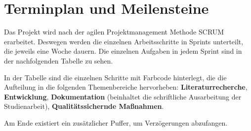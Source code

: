 


\newcommand{\Titel}{Projektplan}





\section{Terminplan und Meilensteine}
Das Projekt wird nach der agilen Projektmanagement Methode SCRUM erarbeitet.
Deswegen werden die einzelnen Arbeitsschritte in Sprints unterteilt, die jeweils eine Woche dauern.
Die einzelnen Aufgaben in jedem Sprint sind in der nachfolgenden Tabelle zu sehen.

In der Tabelle sind die einzelnen Schritte mit Farbcode hinterlegt, die die Aufteilung in die folgenden Themenbereiche hervorheben: \textcolor{literaturrecherche}{\textbf{Literaturrecherche}}, \textcolor{entwicklung}{\textbf{Entwicklung}}, \textcolor{dokumentation}{\textbf{Dokumentation}} (beinhaltet die schriftliche Ausarbeitung der Studienarbeit), \textcolor{QS}{\textbf{Qualitätssichernde Maßnahmen}}.

Am Ende existiert ein zusätzlicher Puffer, um Verzögerungen abzufangen.


\begin{center}
\end{center}
